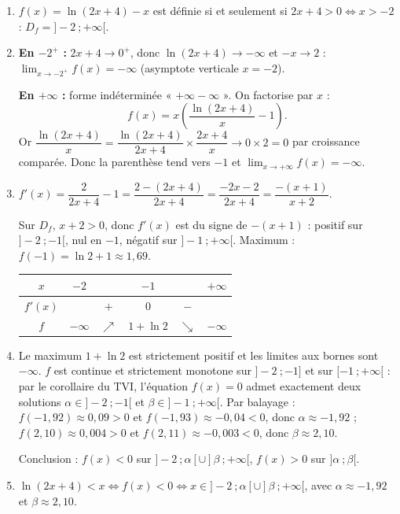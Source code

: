 \documentclass[11pt]{article}
\begin{document}
\begin{corrige}
\begin{enumerate}
\item $f(x) = \ln(2x+4) - x$ est définie si et seulement si $2x + 4 > 0 \iff x > -2$ : $D_f = ]-2\ ; +\infty[$.
\item \textbf{En $-2^+$ :} $2x + 4 \to 0^+$, donc $\ln(2x+4) \to -\infty$ et $-x \to 2$ : $\displaystyle\lim_{x \to -2^+} f(x) = -\infty$ (asymptote verticale $x = -2$).

\textbf{En $+\infty$ :} forme indéterminée « $+\infty - \infty$ ». On factorise par $x$ :
\[ f(x) = x\left(\dfrac{\ln(2x+4)}{x} - 1\right). \]
Or $\dfrac{\ln(2x+4)}{x} = \dfrac{\ln(2x+4)}{2x+4} \times \dfrac{2x+4}{x} \to 0 \times 2 = 0$ par croissance comparée. Donc la parenthèse tend vers $-1$ et $\displaystyle\lim_{x \to +\infty} f(x) = -\infty$.
\item $f'(x) = \dfrac{2}{2x+4} - 1 = \dfrac{2 - (2x+4)}{2x+4} = \dfrac{-2x - 2}{2x+4} = \dfrac{-(x+1)}{x+2}$.

Sur $D_f$, $x + 2 > 0$, donc $f'(x)$ est du signe de $-(x+1)$ : positif sur $]-2\ ; -1[$, nul en $-1$, négatif sur $]-1\ ; +\infty[$. Maximum : $f(-1) = \ln 2 + 1 \approx 1{,}69$.
\begin{center}
\begin{tabular}{|c|ccccc|}\hline
$x$ & $-2$ & & $-1$ & & $+\infty$ \\ \hline
$f'(x)$ & & $+$ & $0$ & $-$ & \\ \hline
$f$ & $-\infty$ & $\nearrow$ & $1 + \ln 2$ & $\searrow$ & $-\infty$ \\ \hline
\end{tabular}
\end{center}
\item Le maximum $1 + \ln 2$ est strictement positif et les limites aux bornes sont $-\infty$. $f$ est continue et strictement monotone sur $]-2\ ; -1]$ et sur $[-1\ ; +\infty[$ : par le corollaire du TVI, l'équation $f(x) = 0$ admet exactement deux solutions $\alpha \in ]-2\ ; -1[$ et $\beta \in ]-1\ ; +\infty[$. Par balayage : $f(-1{,}92) \approx 0{,}09 > 0$ et $f(-1{,}93) \approx -0{,}04 < 0$, donc $\alpha \approx -1{,}92$ ; $f(2{,}10) \approx 0{,}004 > 0$ et $f(2{,}11) \approx -0{,}003 < 0$, donc $\beta \approx 2{,}10$.

Conclusion : $f(x) < 0$ sur $]-2\ ; \alpha[ \cup ]\beta\ ; +\infty[$, $f(x) > 0$ sur $]\alpha\ ; \beta[$.
\item $\ln(2x+4) < x \iff f(x) < 0 \iff x \in ]-2\ ; \alpha[ \cup ]\beta\ ; +\infty[$, avec $\alpha \approx -1{,}92$ et $\beta \approx 2{,}10$.
\end{enumerate}
\end{corrige}
\end{document}
